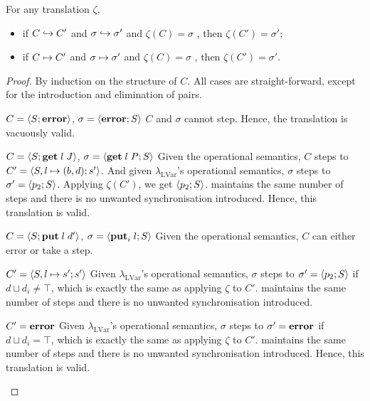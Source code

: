 \documentclass[main.tex]{subfiles}
\begin{document}
\begin{lemma}
  For any translation $\zeta$,
  \begin{itemize}
    \item if $C \red C'$ and $\sigma\red\sigma'$ and $\zeta(C) =
      \sigma$ , then $\zeta(C') = \sigma'$;
    \item if $C \rede C'$ and $\sigma\rede\sigma'$ and $\zeta(C) =
      \sigma$ , then $\zeta(C') = \sigma'$.
  \end{itemize}
\end{lemma}

\begin{proof}
  By induction on the structure of $C$. All cases are straight-forward, except
  for the introduction and elimination of pairs.

  \begin{case}{%
      $C = \config{\lvarerror}{S}$,
      $\sigma = \config{S}{\lvarerror}$}
    $C$ and $\sigma$ cannot step. Hence, the translation is vacuously valid.
  \end{case}

  \begin{case}{%
      $C = \config{\lvarget\;l\;J}{S}$,
      $\sigma = \config{S}{\lvarget\;l\;P}$}
    Given the operational semantics, $C$ steps to $C' = \config{s'}{S, l \mapsto (b, d)}$. And given $\lambda_{\text{LVar}}$'s operational semantics, $\sigma$ steps to $\sigma' = \config{S}{p_2}$. Applying $\zeta (C')$, we get $\config{S}{p_2}$. \typedlambdalvar maintains the same number of steps and there is no unwanted synchronisation introduced. Hence, this translation is valid.
  \end{case}

  \begin{case}{%
      $C = \config{\lvarput\;l\;d'}{S}$,
      $\sigma = \config{S}{\lvarput_{i}\;l}$}
    Given the operational semantics, $C$ can either error or take a step.
    \begin{subcase}{$C' = \config{s'}{S, l \mapsto s'}$}
      Given $\lambda_{\text{LVar}}$'s operational semantics, $\sigma$ steps to $\sigma' = \config{S}{p_2}$ if $d \sqcup d_{i} \neq \top$, which is exactly the same as applying $\zeta$ to $C'$. \typedlambdalvar maintains the same number of steps and there is no unwanted synchronisation introduced.
    \end{subcase}
    \begin{subcase}{$C' = \lvarerror$}
      Given $\lambda_{\text{LVar}}$'s operational semantics, $\sigma$ steps to $\sigma' = \lvarerror$ if $d \sqcup d_{i} = \top$, which is exactly the same as applying $\zeta$ to $C'$. \typedlambdalvar maintains the same number of steps and there is no unwanted synchronisation introduced. Hence, this translation is valid.
    \end{subcase}
  \end{case}


\end{proof}
\end{document}
